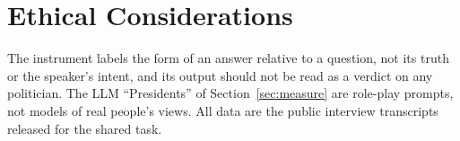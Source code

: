 \section*{Ethical Considerations}

The instrument labels the form of an answer relative to a question, not its truth or the speaker's intent, and its output should not be read as a verdict on any politician.
The LLM ``Presidents'' of Section~\ref{sec:measure} are role-play prompts, not models of real people's views.
All data are the public interview transcripts released for the shared task.
